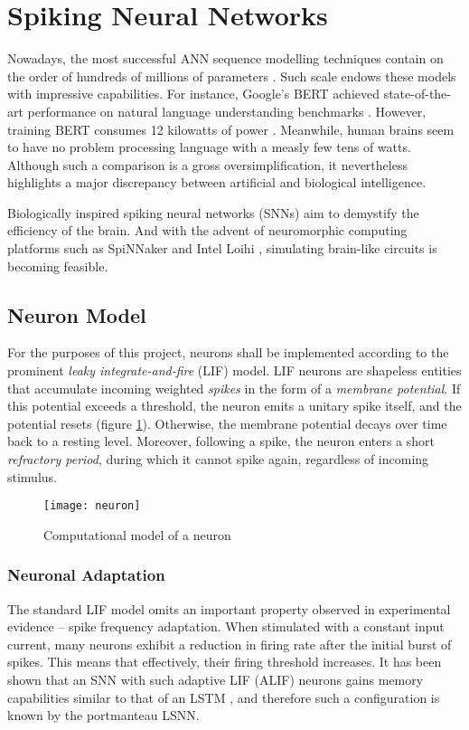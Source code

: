 \documentclass[../../report.tex]{subfiles}
\begin{document}
\section{Spiking Neural Networks}

Nowadays, the most successful ANN sequence modelling techniques contain on the
order of hundreds of millions of parameters \cite{Bender2021}. Such scale endows
these models with impressive capabilities. For instance, Google's BERT achieved
state-of-the-art performance on natural language understanding benchmarks
\cite{Devlin2019}. However, training BERT consumes 12 kilowatts of power
\cite{Strubell2019}. Meanwhile, human brains seem to have no problem processing
language with a measly few tens of watts. Although such a comparison is a gross
oversimplification, it nevertheless highlights a major discrepancy between
artificial and biological intelligence.

Biologically inspired spiking neural networks (SNNs) aim to demystify the
efficiency of the brain. And with the advent of neuromorphic computing platforms
such as SpiNNaker \cite{Furber2014} and Intel Loihi \cite{Davies2018},
simulating brain-like circuits is becoming feasible.

\subsection{Neuron Model}

For the purposes of this project, neurons shall be implemented according to the
prominent \emph{leaky integrate-and-fire} (LIF) model. LIF neurons are shapeless
entities that accumulate incoming weighted \emph{spikes} in the form of a
\emph{membrane potential}. If this potential exceeds a threshold, the neuron
emits a unitary spike itself, and the potential resets (figure
\ref{fig:neuron}). Otherwise, the membrane potential decays over time back to a
resting level. Moreover, following a spike, the neuron enters a short
\emph{refractory period}, during which it cannot spike again, regardless of
incoming stimulus.

\begin{figure}
  \centering
  \texttt{[image: neuron]}
  \caption{Computational model of a neuron \cite{Lobo2020}}
  \label{fig:neuron}
\end{figure}

\subsubsection{Neuronal Adaptation}
The standard LIF model omits an important property observed in experimental
evidence -- spike frequency adaptation. When stimulated with a constant input
current, many neurons exhibit a reduction in firing rate after the initial burst
of spikes. This means that effectively, their firing threshold increases. It has
been shown that an SNN with such adaptive LIF (ALIF) neurons gains memory
capabilities similar to that of an LSTM \cite{Bellec2018LSNN}, and therefore
such a configuration is known by the portmanteau LSNN.
\end{document}
